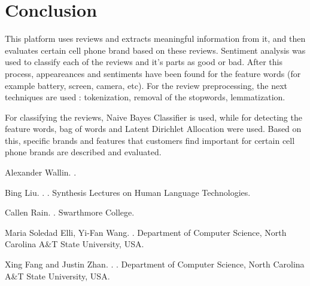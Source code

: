 \documentclass[11pt]{article}
\begin{document}
\section{Conclusion}
This platform uses reviews and extracts meaningful information from it, and then evaluates certain cell phone brand based on these reviews. Sentiment analysis was used to classify each of the reviews and it's parts as good or bad. After this process, appeareances and sentiments have been found for the feature words (for example battery, screen, camera, etc). For the review preprocessing, the next techniques are used : tokenization, removal of the stopwords, lemmatization. \par

For classifying the reviews, Naive Bayes Classifier is used, while for detecting the feature words, bag of words and Latent Dirichlet Allocation were used. Based on this, specific brands and features that customers find important for certain cell phone brands are described and evaluated.  

\begin{thebibliography}{}

Alexander Wallin.
.


Bing Liu.
.
.
\newblock Synthesis Lectures on Human Language Technologies.


Callen Rain.
.
\newblock Swarthmore College.


Maria Soledad Elli, Yi-Fan Wang.
.
\newblock Department of Computer Science, North Carolina A\&T State University, USA.


Xing Fang and Justin Zhan.
.
.
\newblock Department of Computer Science, North Carolina A\&T State University, USA.



\end{thebibliography}
\end{document}
